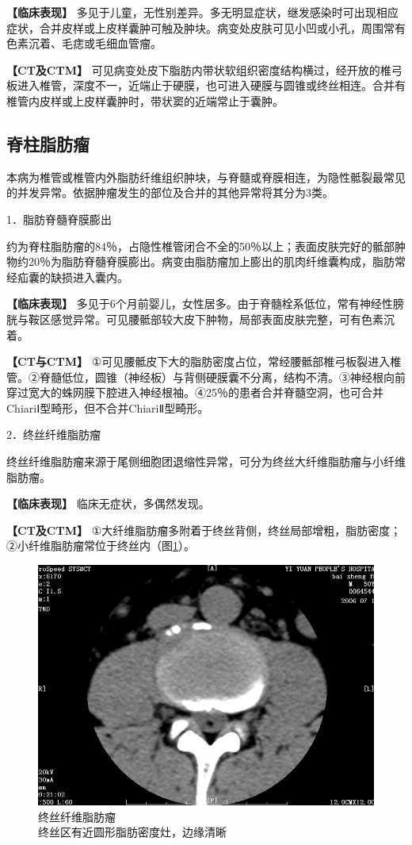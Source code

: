 \textbf{【临床表现】}
多见于儿童，无性别差异。多无明显症状，继发感染时可出现相应症状，合并皮样或上皮样囊肿可触及肿块。病变处皮肤可见小凹或小孔，周围常有色素沉着、毛痣或毛细血管瘤。

\textbf{【CT及CTM】}
可见病变处皮下脂肪内带状软组织密度结构横过，经开放的椎弓板进入椎管，深度不一，近端止于硬膜，也可进入硬膜与圆锥或终丝相连。合并有椎管内皮样或上皮样囊肿时，带状窦的近端常止于囊肿。

\subsection{脊柱脂肪瘤}

本病为椎管或椎管内外脂肪纤维组织肿块，与脊髓或脊膜相连，为隐性骶裂最常见的并发异常。依据肿瘤发生的部位及合并的其他异常将其分为3类。

1．脂肪脊髓脊膜膨出

约为脊柱脂肪瘤的84％，占隐性椎管闭合不全的50％以上；表面皮肤完好的骶部肿物约20％为脂肪脊髓脊膜膨出。病变由脂肪瘤加上膨出的肌肉纤维囊构成，脂肪常经疝囊的缺损进入囊内。

\textbf{【临床表现】}
多见于6个月前婴儿，女性居多。由于脊髓栓系低位，常有神经性膀胱与鞍区感觉异常。可见腰骶部较大皮下肿物，局部表面皮肤完整，可有色素沉着。

\textbf{【CT与CTM】}
①可见腰骶皮下大的脂肪密度占位，常经腰骶部椎弓板裂进入椎管。②脊髓低位，圆锥（神经板）与背侧硬膜囊不分离，结构不清。③神经根向前穿过宽大的蛛网膜下腔进入神经根袖。④25％的患者合并脊髓空洞，也可合并ChiariⅠ型畸形，但不合并ChiariⅡ型畸形。

2．终丝纤维脂肪瘤

终丝纤维脂肪瘤来源于尾侧细胞团退缩性异常，可分为终丝大纤维脂肪瘤与小纤维脂肪瘤。

\textbf{【临床表现】} 临床无症状，多偶然发现。

\textbf{【CT及CTM】}
①大纤维脂肪瘤多附着于终丝背侧，终丝局部增粗，脂肪密度；②小纤维脂肪瘤常位于终丝内（图\ref{fig23-2}）。

\begin{figure}[!htbp]
 \centering
 \includegraphics[width=.7\textwidth,height=\textheight,keepaspectratio]{./images/Image00465.jpg}
 \captionsetup{justification=centering}
 \caption{终丝纤维脂肪瘤\\{\small 终丝区有近圆形脂肪密度灶，边缘清晰}}
 \label{fig23-2}
  \end{figure} 

